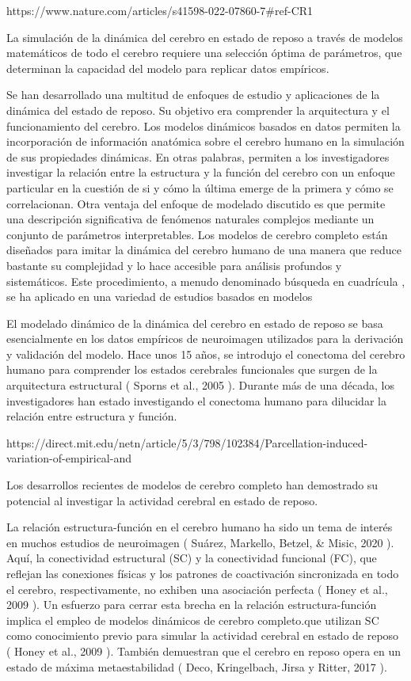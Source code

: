 https://www.nature.com/articles/s41598-022-07860-7#ref-CR1

La simulación de la dinámica del cerebro en estado de reposo a través de modelos matemáticos de todo el cerebro requiere una selección óptima de parámetros, que determinan la capacidad del modelo para replicar datos empíricos. 

Se han desarrollado una multitud de enfoques de estudio y aplicaciones de la dinámica del estado de reposo. Su objetivo era comprender la arquitectura y el funcionamiento del cerebro. Los modelos dinámicos basados ​​en datos permiten la incorporación de información anatómica sobre el cerebro humano en la simulación de sus propiedades dinámicas. En otras palabras, permiten a los investigadores investigar la relación entre la estructura y la función del cerebro con un enfoque particular en la cuestión de si y cómo la última emerge de la primera y cómo se correlacionan.  Otra ventaja del enfoque de modelado discutido es que permite una descripción significativa de fenómenos naturales complejos mediante un conjunto de parámetros interpretables. Los modelos de cerebro completo están diseñados para imitar la dinámica del cerebro humano de una manera que reduce bastante su complejidad y lo hace accesible para análisis profundos y sistemáticos. Este procedimiento, a menudo denominado búsqueda en cuadrícula , se ha aplicado en una variedad de estudios basados ​​en modelos

El modelado dinámico de la dinámica del cerebro en estado de reposo se basa esencialmente en los datos empíricos de neuroimagen utilizados para la derivación y validación del modelo. Hace unos 15 años, se introdujo el conectoma del cerebro humano para comprender los estados cerebrales funcionales que surgen de la arquitectura estructural ( Sporns et al., 2005 ). Durante más de una década, los investigadores han estado investigando el conectoma humano para dilucidar la relación entre estructura y función. 

https://direct.mit.edu/netn/article/5/3/798/102384/Parcellation-induced-variation-of-empirical-and

Los desarrollos recientes de modelos de cerebro completo han demostrado su potencial al investigar la actividad cerebral en estado de reposo. 

La relación estructura-función en el cerebro humano ha sido un tema de interés en muchos estudios de neuroimagen ( Suárez, Markello, Betzel, & Misic, 2020 ). Aquí, la conectividad estructural (SC) y la conectividad funcional (FC), que reflejan las conexiones físicas y los patrones de coactivación sincronizada en todo el cerebro, respectivamente, no exhiben una asociación perfecta ( Honey et al., 2009 ). Un esfuerzo para cerrar esta brecha en la relación estructura-función implica el empleo de modelos dinámicos de cerebro completo.que utilizan SC como conocimiento previo para simular la actividad cerebral en estado de reposo ( Honey et al., 2009 ).
También demuestran que el cerebro en reposo opera en un estado de máxima metaestabilidad ( Deco, Kringelbach, Jirsa y Ritter, 2017 ). 

